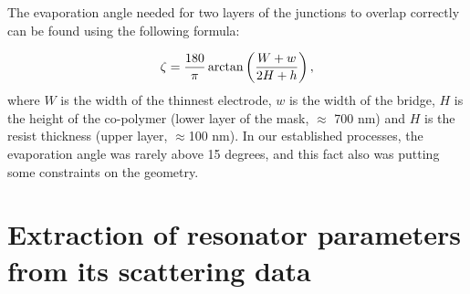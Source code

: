 The evaporation angle needed for two layers of the junctions to overlap correctly can be found using the following formula:

\[
\zeta = \frac{180}{\pi}\arctan\left( \frac{W+w}{2H+h} \right),
\]
where $W$ is the width of the thinnest electrode, $w$ is the width of the bridge, $H$ is the height of the co-polymer (lower layer of the mask, $\approx$ 700 nm) and $H$ is the resist thickness (upper layer, $\approx$100 nm). In our established processes, the evaporation angle was rarely above 15 degrees, and this fact also was putting some constraints on the geometry.


\section{Extraction of resonator parameters from its scattering data}\label{sec:circlefit}

